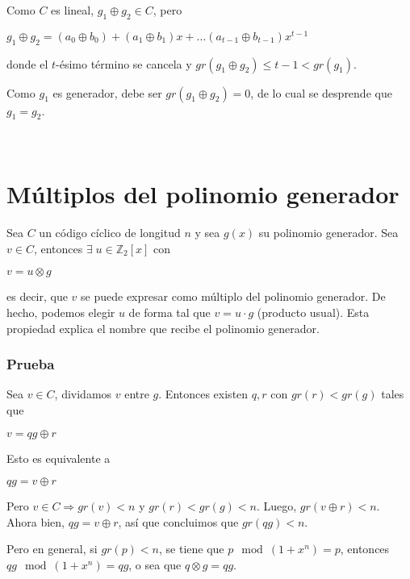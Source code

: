 \documentclass[10pt,a4paper]{article}
\begin{document}
Como $C$ es lineal, $g_1\oplus g_2 \in C$, pero

\begin{center}
$g_1 \oplus g_2 = (a_0\oplus b_0) +
(a_1\oplus b_1) x+
\dots
(a_{t-1}\oplus b_{t-1})x^{t-1}$
\end{center}

donde el $t$-ésimo término se cancela y $gr(g_1\oplus g_2) \leq t - 1 < gr(g_1)$.

Como $g_1$ es generador, debe ser $gr(g_1\oplus g_2) = 0 $, de lo cual se desprende que $g_1 = g_2$.

 

\section*{Múltiplos del polinomio generador}

Sea $C$ un código cíclico de longitud $n$ y sea $g(x)$ su polinomio generador. Sea $v \in C$, entonces $\exists \; u\in \mathbb{Z}_2\left[x\right]$ con

\begin{center}
$v = u \otimes g$
\end{center}

es decir, que $v$ se puede expresar como múltiplo del polinomio generador. De hecho, podemos elegir $u$ de forma tal que $v = u \cdot g$ (producto usual). Esta propiedad explica el nombre que recibe el polinomio generador.

\subsubsection*{Prueba}

Sea $v \in C$, dividamos $v $ entre $g$. Entonces existen $q, r$ con $gr(r) < gr(g)$ tales que

\begin{center}
$v = qg\oplus r$
\end{center}

Esto es equivalente a

\begin{center}
$qg = v \oplus r$
\end{center}

Pero $v \in C \Rightarrow gr(v) < n$ y $gr(r) < gr(g) < n$. Luego, $gr(v \oplus r) < n$. Ahora bien, $qg = v \oplus r$, así que concluimos que $gr(qg) < n$.

Pero en general, si $gr(p) < n$, se tiene que $p \mod (1+x^n) = p$, entonces $qg \mod (1+x^n)=qg$, o sea que $q \otimes g = qg$.
\end{document}
